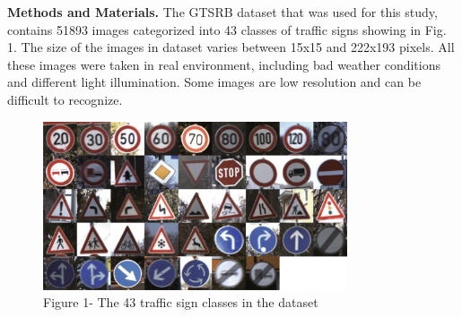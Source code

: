 \begin{multicols}{2}
{\bfseries Methods and Materials.} The GTSRB dataset that was used for this
study, contains 51893 images categorized into 43 classes of traffic
signs showing in Fig. 1. The size of the images in dataset varies
between 15x15 and 222x193 pixels. All these images were taken in real
environment, including bad weather conditions and different light
illumination. Some images are low resolution and can be difficult to
recognize.
\end{multicols}

\begin{figure}[H]
	\centering
	\includegraphics[width=0.8\textwidth]{assets/57}
	\caption*{Figure 1- The 43 traffic sign classes in the dataset}
\end{figure}

